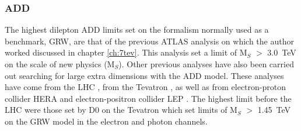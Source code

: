     \subsubsection*{ADD}
        The highest dilepton ADD limits set on the formalism normally used as a benchmark, GRW, are that of the previous ATLAS analysis on which the author worked \cite{PhysRevD.87.015010} discussed in chapter \ref{ch:7tev}. This analysis set a limit of M$_{S}$ $>$ 3.0~TeV on the scale of new physics (M$_{S}$). Other previous analyses have also been carried out searching for large extra dimensions with the ADD model. These analyses have come from the LHC \cite{PhysRevD.87.015010,ATLAS:2011ab,Chatrchyan201215,PhysRevLett.108.111801}, from the Tevatron \cite{Abazov:2008as,PhysRevLett.95.161602,PhysRevLett.103.191803}, as well as from electron-proton collider HERA \cite{Adloff2000358,Chekanov200423} and electron-positron collider LEP \cite{Acciarri1999281,Acciarri1999135,Abreu200045,Abreu200067,Abbiendi2003331,Abbiendi2000553}. The highest limit before the LHC were those set by D0 on the Tevatron \cite{Abazov:2008as} which set limits of M$_{S}$ $>$ 1.45~TeV on the GRW model in the electron and photon channels. 








